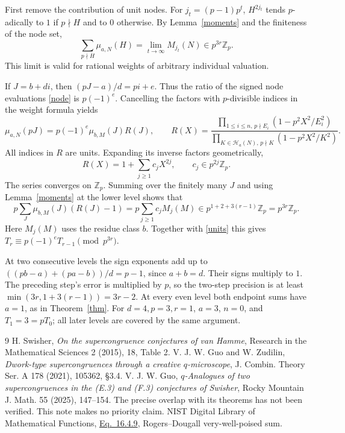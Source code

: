 \documentclass[11pt]{article}
\newcommand{\Z}{\mathbb Z}
\newcommand{\HH}{\mathcal H}
\begin{document}
First remove the contribution of unit nodes. For $j_t=(p-1)p^t$,
$H^{2j_t}$ tends $p$-adically to $1$ if $p\nmid H$ and to $0$
otherwise. By Lemma~\ref{moments} and the finiteness of the node set,
\begin{equation}\label{units}
 \sum_{p\nmid H}\mu_{a,N}(H)=\lim_{t\to\infty}M_{j_t}(N)
         \in p^{3r}\Z_p.
\end{equation}
This limit is valid for rational weights of arbitrary individual valuation.

If $J=b+di$, then $(pJ-a)/d=pi+e$. Thus the ratio of the signed
node evaluations \eqref{node} is $p(-1)^e$. Cancelling the factors
with $p$-divisible indices in the weight formula yields
\[
 \mu_{a,N}(pJ)=p(-1)^e\mu_{b,M}(J)R(J),\qquad
 R(X)=\frac{\prod_{1\le i\le n,\,p\nmid E_i}(1-p^2X^2/E_i^2)}
 {\prod_{K\in\HH_a(N),\,p\nmid K}(1-p^2X^2/K^2)}.
\]
All indices in $R$ are units. Expanding its inverse factors geometrically,
\[
 R(X)=1+\sum_{j\ge1}c_jX^{2j},\qquad c_j\in p^{2j}\Z_p .
\]
The series converges on $\Z_p$. Summing over the finitely many $J$ and
using Lemma~\ref{moments} at the lower level shows that
\[
 p\sum_{J}\mu_{b,M}(J)(R(J)-1)
 =p\sum_{j\ge1}c_jM_j(M)\in
 p^{1+2+3(r-1)}\Z_p=p^{3r}\Z_p.
\]
Here $M_j(M)$ uses the residue class $b$. Together with \eqref{units}
this gives $T_r\equiv p(-1)^eT_{r-1}\pmod{p^{3r}}$.

At two consecutive levels the sign exponents add up to
$((pb-a)+(pa-b))/d=p-1$, since $a+b=d$. Their signs multiply to $1$.
The preceding step's error is multiplied by $p$, so the two-step
precision is at least $\min(3r,1+3(r-1))=3r-2$. At every even
level both endpoint sums have $a=1$, as in Theorem~\ref{thm}.
For $d=4,p=3,r=1$, $a=3$, $n=0$, and $T_1=3=pT_0$; all later
levels are covered by the same argument.

\small
\begin{thebibliography}{9}
 H. Swisher, \emph{On the supercongruence conjectures of
van Hamme}, Research in the Mathematical Sciences 2 (2015), 18, Table 2.
 V. J. W. Guo and W. Zudilin, \emph{Dwork-type supercongruences
through a creative $q$-microscope}, J. Combin. Theory Ser. A 178 (2021),
105362, \S3.4.
 V. J. W. Guo, \emph{$q$-Analogues of two supercongruences in
the (E.3) and (F.3) conjectures of Swisher}, Rocky Mountain J. Math.
55 (2025), 147--154. The precise overlap with its theorems has not
been verified. This note makes no priority claim.
 NIST Digital Library of Mathematical Functions,
\href{https://dlmf.nist.gov/16.4.E9}{Eq.~16.4.9}, Rogers--Dougall
very-well-poised sum.
\end{thebibliography}
\end{document}
